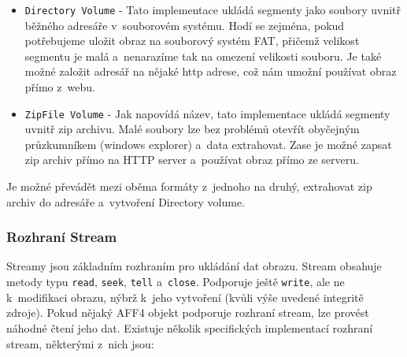 \begin{itemize}
\item \texttt{Directory Volume} - Tato implementace ukládá segmenty jako soubory uvnitř běžného adresáře v~souborovém systému. Hodí se zejména, pokud potřebujeme uložit obraz na souborový systém FAT, přičemž velikost segmentu je malá a~nenarazíme tak na omezení velikosti souboru. Je také možné založit adresář na nějaké http adrese, což nám umožní používat obraz přímo z~webu.

\item \texttt{ZipFile Volume} - Jak napovídá název, tato implementace ukládá segmenty uvnitř zip archivu. Malé soubory lze bez problémů otevřít obyčejným průzkumníkem (windows explorer) a~data extrahovat. Zase je možné zapsat zip archiv přímo na HTTP server a~používat obraz přímo ze serveru.
\end{itemize}

\noindent Je možné převádět mezi oběma formáty z~jednoho na druhý, extrahovat zip archiv do adresáře a~vytvoření Directory volume.

\subsubsection{Rozhraní Stream}
Streamy jsou základním rozhraním pro ukládání dat obrazu. Stream obsahuje metody typu \texttt{read}, \texttt{seek}, \texttt{tell} a~\texttt{close}. Podporuje ještě \texttt{write}, ale ne k~modifikaci obrazu, nýbrž k~jeho vytvoření (kvůli výše uvedené integritě zdroje). Pokud nějaký AFF4 objekt podporuje rozhraní stream, lze provést náhodné čtení jeho dat. Existuje několik specifických implementací rozhraní stream, některými z~nich jsou:

